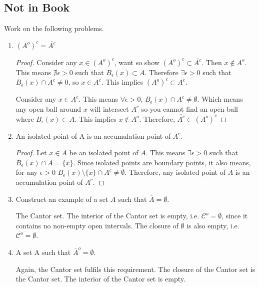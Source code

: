 \documentclass{tufte-book}
\theoremstyle{mytheoremstyle}
\theoremstyle{mylemstyle}
\theoremstyle{mydefstyle}
\begin{document}
\subsection{Not in Book}
Work on the following problems.

\begin{enumerate}
\item $(A^o)^c = \overline{A^c}$
\begin{proof}
Consider any $x \in (A^o)^c$, want so show $(A^o)^c \subset \overline{A^c}$.  Then $x \notin A^o$.  This means $\nexists \epsilon > 0$ such that $B_\epsilon(x) \subset A$.  Therefore $\exists\epsilon > 0$ such that $B_\epsilon(x) \cap A^c \neq 0$, so $x \in \overline{A^c}$.  This implies $(A^o)^c \subset \overline{A^c}$.

Consider any $x \in \overline{A^c}$.  This means $\forall\epsilon >0$, $B_\epsilon(x) \cap A^c \neq \emptyset$.  Which means any open ball around $x$ will intersect $A^c$ so you cannot find an open ball where $B_\epsilon(x) \subset A$.  This implies $x \notin A^o$.  Therefore, $\overline{A^c} \subset (A^o)^c$

\end{proof}

\item An isolated point of A is an accumulation point of $A^c$.

\begin{proof}
Let $x \in A$ be an isolated point of $A$.  This means $\exists\epsilon>0$ such that $B_\epsilon (x) \cap A = \{x\}$.  Since isolated points are boundary points,  it also means, for any $\epsilon >0$ $B_\epsilon(x)\setminus \{x\} \cap A^c \neq \emptyset$.  Therefore, any isolated point of $A$ is an accumulation point of $A^c$.

\end{proof}

\item Construct an example of a set $A$ such that $\overline{A} = \emptyset$.

The Cantor set.  The interior of the Cantor set is empty, i.e. $\mathcal{C}^o = \emptyset$, since it contains no non-empty open intervals.  The closure of $\emptyset$ is also empty, i.e. $\overline{\mathcal{C}^o} = \emptyset$.

\item A set A such that $\overline{A}^o = \emptyset$.

Again, the Cantor set fulfils this requirement.  The closure of the Cantor set is the Cantor set.  The interior of the Cantor set is empty.

\end{enumerate}
\end{document}
